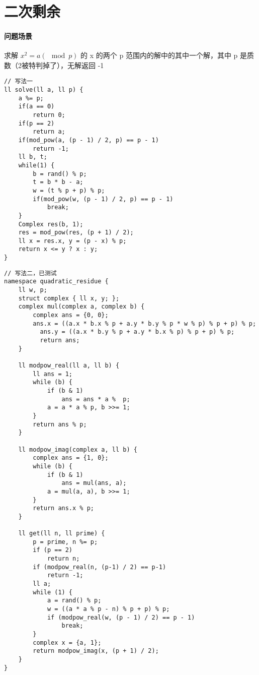 \section{二次剩余}

\paragraph{问题场景} 求解 $x^2 = a (\mod p)$ 的 x 的两个 p 范围内的解中的其中一个解，其中 p 是质数（2被特判掉了），无解返回 -1

\begin{verbatim}
// 写法一
ll solve(ll a, ll p) {
    a %= p;
    if(a == 0)
        return 0;
    if(p == 2)
        return a;
    if(mod_pow(a, (p - 1) / 2, p) == p - 1)
        return -1;
    ll b, t;
    while(1) {
        b = rand() % p;
        t = b * b - a;
        w = (t % p + p) % p;
        if(mod_pow(w, (p - 1) / 2, p) == p - 1)
            break;
    }
    Complex res(b, 1);
    res = mod_pow(res, (p + 1) / 2);
    ll x = res.x, y = (p - x) % p;
    return x <= y ? x : y;
}
\end{verbatim}

\begin{verbatim}
// 写法二，已测试
namespace quadratic_residue {
    ll w, p;
    struct complex { ll x, y; };	
    complex mul(complex a, complex b) {
        complex ans = {0, 0};
        ans.x = ((a.x * b.x % p + a.y * b.y % p * w % p) % p + p) % p;
          ans.y = ((a.x * b.y % p + a.y * b.x % p) % p + p) % p;
          return ans;
    }
    
    ll modpow_real(ll a, ll b) {
        ll ans = 1;
        while (b) {
            if (b & 1)
                ans = ans * a %  p;
            a = a * a % p, b >>= 1;
        }
        return ans % p;
    }
    
    ll modpow_imag(complex a, ll b) {
        complex ans = {1, 0};
        while (b) {
            if (b & 1)
                ans = mul(ans, a);
            a = mul(a, a), b >>= 1;
        }
        return ans.x % p;
    }
    
    ll get(ll n, ll prime) {
        p = prime, n %= p;
        if (p == 2)
            return n;
        if (modpow_real(n, (p-1) / 2) == p-1)
            return -1;
        ll a;
        while (1) {
            a = rand() % p;
            w = ((a * a % p - n) % p + p) % p;
            if (modpow_real(w, (p - 1) / 2) == p - 1)
                break;
        }
        complex x = {a, 1};
        return modpow_imag(x, (p + 1) / 2);
    }
}
\end{verbatim}